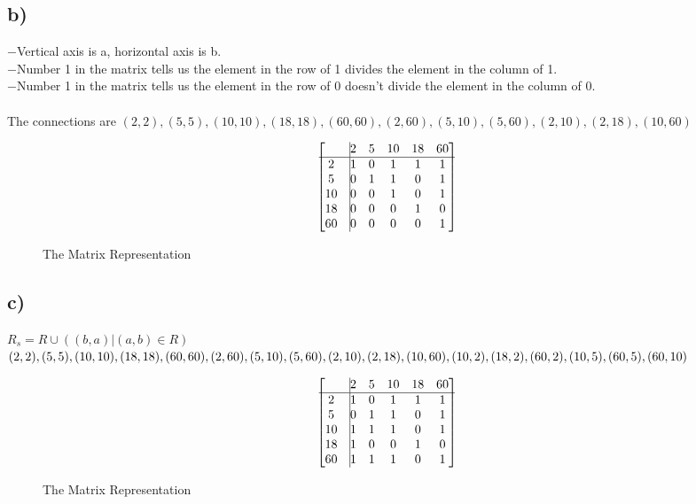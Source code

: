 \documentclass[12pt]{article}
\begin{document}
\subsection*{b) }
$-$Vertical axis is a, horizontal axis is b.\\
$-$Number 1 in the matrix tells us the element in the row of 1 divides the element in the column of 1.\\
$-$Number 1 in the matrix tells us the element in the row of 0 doesn't divide the element in the column of 0.\\
\\
The connections are $(2,2), (5,5), (10,10), (18,18), (60,60), (2,60), (5,10), (5,60), (2,10), (2,18), (10,60)$
\begin{figure}[H]
            $$  
                \begin{bmatrix}{}
                  &\vline 2 & 5 & 10 & 18 & 60 \\ 
			\hline
		  2 &\vline 1 & 0 & 1 & 1 & 1 \\
               5 &\vline 0 & 1 & 1 & 0 & 1 \\
              10 &\vline 0 & 0 & 1 & 0 & 1 \\
              18 &\vline 0 & 0 & 0 & 1 & 0 \\
		  60 &\vline 0 & 0 & 0 & 0 & 1 \\
                \end{bmatrix}{} 
            $$
		\caption{The Matrix Representation}
            \end{figure}{}

\subsection*{c) }
$R_s = R \cup ((b,a)|(a,b) \in R)$\\
$(2,2), (5,5), (10,10), (18,18), (60,60), (2,60), (5,10), (5,60), (2,10), (2,18), (10,60), (10, 2),(18, 2),\\(60, 2),(10, 5),(60, 5),(60, 10)$\\
\begin{figure}[H]
            $$  
                \begin{bmatrix}{}
                  &\vline 2 & 5 & 10 & 18 & 60 \\ 
			\hline
		  2 &\vline 1 & 0 & 1 & 1 & 1 \\
               5 &\vline 0 & 1 & 1 & 0 & 1 \\
              10 &\vline 1 & 1 & 1 & 0 & 1 \\
              18 &\vline 1 & 0 & 0 & 1 & 0 \\
		  60 &\vline 1 & 1 & 1 & 0 & 1 \\
                \end{bmatrix}{} 
            $$
		\caption{The Matrix Representation}
            \end{figure}{}
\end{document}
